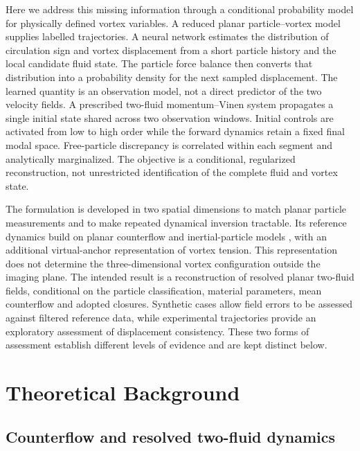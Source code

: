 \documentclass[11pt]{article}
\numberwithin{equation}{section}
\begin{document}
Here we address this missing information through a conditional probability model for physically defined vortex variables. A reduced planar particle--vortex model supplies labelled trajectories. A neural network estimates the distribution of circulation sign and vortex displacement from a short particle history and the local candidate fluid state. The particle force balance then converts that distribution into a probability density for the next sampled displacement. The learned quantity is an observation model, not a direct predictor of the two velocity fields. A prescribed two-fluid momentum--Vinen system propagates a single initial state shared across two observation windows. Initial controls are activated from low to high order while the forward dynamics retain a fixed final modal space. Free-particle discrepancy is correlated within each segment and analytically marginalized. The objective is a conditional, regularized reconstruction, not unrestricted identification of the complete fluid and vortex state.

The formulation is developed in two spatial dimensions to match planar particle measurements and to make repeated dynamical inversion tractable. Its reference dynamics build on planar counterflow and inertial-particle models \citep{Galantucci2015,Varga2014}, with an additional virtual-anchor representation of vortex tension. This representation does not determine the three-dimensional vortex configuration outside the imaging plane. The intended result is a reconstruction of resolved planar two-fluid fields, conditional on the particle classification, material parameters, mean counterflow and adopted closures. Synthetic cases allow field errors to be assessed against filtered reference data, while experimental trajectories provide an exploratory assessment of displacement consistency. These two forms of assessment establish different levels of evidence and are kept distinct below.

\section{Theoretical Background}
\label{sec:theory}

\subsection{Counterflow and resolved two-fluid dynamics}
\label{sec:twofluid}
\end{document}
